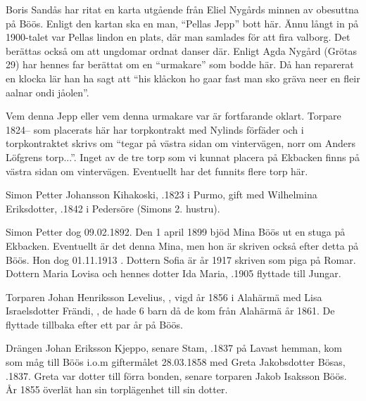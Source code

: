 
Boris Sandås har ritat en karta utgående från Eliel Nygårds minnen av obesuttna på Böös. Enligt den kartan ska en man, ``Pellas Jepp'' bott här. Ännu långt in på 1900-talet var Pellas lindon en plats, där man samlades för att fira valborg. Det berättas också om att ungdomar ordnat danser där. Enligt Agda Nygård (Grötas 29) har hennes far berättat om en ``urmakare'' som bodde här. Då han reparerat en klocka lär han ha sagt att ``his klåckon ho gaar fast man sko gräva neer en fleir 	aalnar ondi jåolen''.

Vem denna Jepp eller vem denna urmakare var är fortfarande oklart. Torpare 1824-- som placerats här har torpkontrakt med Nylinds förfäder och i torpkontraktet skrivs om ``tegar på västra sidan om 	vintervägen, norr om Anders Löfgrens torp...''. Inget av de tre torp som vi kunnat placera på Ekbacken finns på västra sidan om 	vintervägen. Eventuellt har det funnits flere torp här.


Simon Petter Johansson Kihakoski, .1823 i Purmo, gift med Wilhelmina Eriksdotter, .1842 i Pedersöre (Simons 2. hustru).
\begin{jhchildren}
  \item {}
  \item {}
  \item {}
  \item {}
  \item {}
\end{jhchildren}
Simon Petter dog 09.02.1892. Den 1 april 1899 bjöd Mina Böös ut en stuga på Ekbacken. Eventuellt är det denna Mina, men hon är skriven också efter detta på Böös. Hon dog 01.11.1913 . Dottern Sofia är år 1917 skriven som piga på Romar. Dottern Maria Lovisa och hennes dotter Ida Maria, .1905 flyttade till Jungar.


Torparen Johan Henriksson Levelius, , vigd år 1856 i Alahärmä med Lisa Israelsdotter Frändi, , de hade 6 barn då de kom från Alahärmä år 1861. De flyttade tillbaka efter ett par år på Böös.


Drängen Johan Eriksson Kjeppo, senare Stam, .1837 på Lavast hemman, kom som måg till Böös i.o.m giftermålet 28.03.1858 med Greta Jakobsdotter Bösas, .1837. Greta var dotter till förra bonden, senare torparen Jakob Isaksson Böös. År 1855 överlät han sin torplägenhet till sin dotter.

